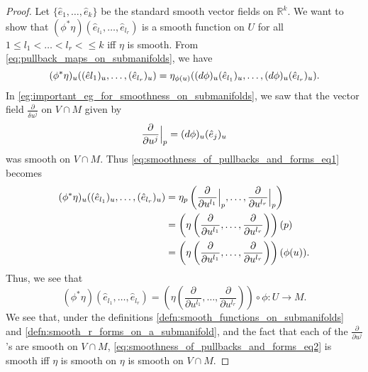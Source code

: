 \documentclass[notoc,notitlepage]{tufte-book}
\begin{document}
\begin{proof}
  Let $\{ \hat{e}_1, \ldots, \hat{e}_k \}$ be the standard smooth vector fields
  on $\mathbb{R}^k$. We want to show that $(\phi^* \eta)(\hat{e}_{l_1}, \ldots,
  \hat{e}_{l_r})$ is a smooth function on $U$ for all $1 \leq l_1 < \hdots < l_r <
  \leq k$ iff $\eta$ is smooth. From \cref{eq:pullback_maps_on_submanifolds}, we
  have
  \begin{equation}\label{eq:smoothness_of_pullbacks_and_forms_eq1}
    (\phi^* \eta)_u ((\hat{e}{l_1})_u, \ldots, (\hat{e}_{l_r})_u) =
    \eta_{\phi(u)} ((\mathop{}\!d{\phi})_u(\hat{e}_{l_1})_u, \ldots, (\mathop{}\!d{\phi})_u
    (\hat{e}_{l_r})_u).
  \end{equation}
  In \cref{eg:important_eg_for_smoothness_on_submanifolds}, we saw that the
  vector field $\frac{\partial}{\delta u^j}$ on $V \cap M$ given by
  \begin{equation*}
    \frac{\partial}{\partial u^j}\Big|_{p}^{} = (\mathop{}\!d{\phi})_u(\hat{e}_j)_u
  \end{equation*}
  was smooth on $V \cap M$. Thus \cref{eq:smoothness_of_pullbacks_and_forms_eq1}
  becomes
  \begin{align*}
    (\phi^* \eta)_u((\hat{e}_{l_1})_u, \ldots, (\hat{e}_{l_r})_u)
    &= \eta_p \left( \frac{\partial}{\partial u^{l_1}}\Big|_{p}^{}, \ldots,
    \frac{\partial}{\partial u^{l_r}}\Big|_{p}^{} \right) \\
    &= \left( \eta \left( \frac{\partial}{\partial u^{l_1}}, \ldots,
    \frac{\partial}{\partial u^{l_r}} \right) \right)(p) \\
    &= \left( \eta \left( \frac{\partial}{\partial u^{l_1}}, \ldots,
    \frac{\partial}{\partial u^{l_r}} \right) \right)(\phi(u)).
  \end{align*}
  Thus, we see that
  \begin{equation}\label{eq:smoothness_of_pullbacks_and_forms_eq2}
    (\phi^* \eta)(\hat{e}_{l_1}, \ldots, \hat{e}_{l_r}) = \left( \eta \left(
    \frac{\partial}{\partial u^{l_1}}, \ldots, \frac{\partial}{\partial u^{l_r}}
    \right) \right) \circ \phi : U \to M.
  \end{equation}
  We see that, under the definitions
  \cref{defn:smooth_functions_on_submanifolds} and
  \cref{defn:smooth_r_forms_on_a_submanifold}, and the fact that each of the
  $\frac{\partial}{\partial u^j}$'s are smooth on $V \cap M$,
  \cref{eq:smoothness_of_pullbacks_and_forms_eq2} is smooth iff $\eta$ is smooth
  on $\eta$ is smooth on $V \cap M$.
\end{proof}
\end{document}

